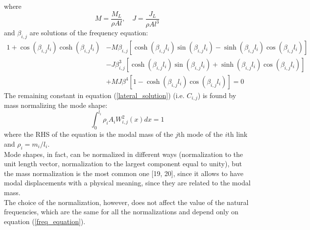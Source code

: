 \documentclass[a4paper,12pt,oneside]{report}
\begin{document}
where 
\begin{equation}
  M=\frac{M_L}{\rho A l}, \quad J=\frac{J_L}{\rho Al^3}
\end{equation}
and $\beta_{i,j}$ are solutions of the frequency equation:
\begin{equation}
  \begin{split}
  1+\cos{(\beta_{i,j}l_i)}\cosh{(\beta_{i,j}l_i)}&-M\beta_{i,j}[\cosh{(\beta_{i,j}l_i)}\sin{(\beta_{i,j}l_i)}-\sinh{(\beta_{i,j}l_i)}\cos{(\beta_{i,j}l_i)}]\\
  &-J\beta_{i,j}^3[\cosh{(\beta_{i,j}l_i)}\sin{(\beta_{i,j}l_i)}+\sinh{(\beta_{i,j}l_i)}\cos{(\beta_{i,j}l_i)}]\\
  &+MJ\beta^4[1-\cosh{(\beta_{i,j}l_i)}\cos{(\beta_{i,j}l_i)}]=0
  \end{split}
  \label{freq_equation}
\end{equation}
The remaining constant in equation (\ref{lateral_solution}) (i.e. $C_{i,j}$) is found by mass normalizing the mode shape:
\begin{equation}
  \int_{0}^{l_i}\rho_i A_i W_{i,j}^2(x)dx=1
\end{equation}
where the RHS of the equation is the modal mass of the $j$th mode of the $i$th link and $\rho_i=m_i/l_i$.\\
Mode shapes, in fact, can be normalized in different ways (normalization to the unit length vector, normalization to the largest component equal to unity), but the mass normalization is the most common one [19, 20], since it allows to have modal displacements with a physical meaning, since they are related to the modal mass.\\
The choice of the normalization, however, does not affect the value of the natural frequencies, which are the same for all the normalizations and depend only on equation (\ref{freq_equation}).\\
\end{document}
